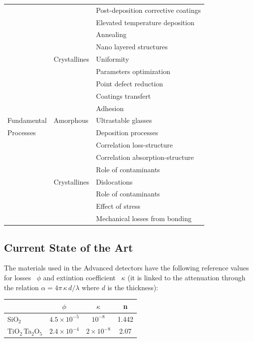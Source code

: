 \begin{longtable}{|p{}|p{}|p{}|}
 & & Post-deposition corrective coatings \\\cline{3-3}
 & & Elevated temperature deposition \\\cline{3-3}
 & & Annealing \\\cline{3-3}
 & & Nano layered structures \\\cline{2-3}
 & Crystallines & Uniformity \\\cline{3-3}
 & & Parameters optimization \\\cline{3-3}
 & & Point defect reduction \\\cline{3-3}
 & & Coatings transfert \\\cline{3-3}
 & & Adhesion \\\hline\hline
{\sc Fundamental} & Amorphous & Ultrastable glasses \\\cline{3-3}
{\sc Processes} & & Deposition processes \\\cline{3-3}
 & & Correlation loss-structure \\\cline{3-3}
 & & Correlation absorption-structure \\\cline{3-3}
 & & Role of contaminants \\\cline{2-3}
 & Crystallines & Dislocations \\\cline{3-3}
 & & Role of contaminants \\\cline{3-3}
 & & Effect of stress \\\cline{3-3}
 & & Mechanical losses from bonding \\\hline\hline
\end{longtable}
%
\subsection{Current State of the Art}
The materials used in the Advanced detectors have the following reference values for losses~\cite{Granata_2016} $\phi$ and extintion coefficient~\cite{Pinard_2017} $\kappa$ (it is linked to the attenuation through the relation $\alpha = 4\pi\,\kappa\,d/\lambda$ where $d$ is the thickness): \\
%
\begin{center}
\begin{tabular}{l|c|c|c}
            & $\phi$ & $\kappa$ & n \\ \hline
 SiO$_2$                 & $4.5\times 10^{-5}$ & $10^{-8}$        & 1.442  \\ \hline
 TiO$_2\,$Ta$_2$O$_5$    & $2.4\times 10^{-4}$ & $2\times 10^{-8}$ & 2.07  \\ \hline
\end{tabular}
\end{center}
%


